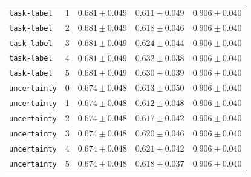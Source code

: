 \documentclass{article}
\begin{document}
\begin{center}
\begin{tabular}{llccc}
\texttt{task-label} & 1 & $0.681 \pm 0.049$ & $0.611 \pm 0.049$ & $0.906 \pm 0.040$ \\
\texttt{task-label} & 2 & $0.681 \pm 0.049$ & $0.618 \pm 0.046$ & $0.906 \pm 0.040$ \\
\texttt{task-label} & 3 & $0.681 \pm 0.049$ & $0.624 \pm 0.044$ & $0.906 \pm 0.040$ \\
\texttt{task-label} & 4 & $0.681 \pm 0.049$ & $0.632 \pm 0.038$ & $0.906 \pm 0.040$ \\
\texttt{task-label} & 5 & $0.681 \pm 0.049$ & $0.630 \pm 0.039$ & $0.906 \pm 0.040$ \\
\texttt{uncertainty} & 0 & $0.674 \pm 0.048$ & $0.613 \pm 0.050$ & $0.906 \pm 0.040$ \\
\texttt{uncertainty} & 1 & $0.674 \pm 0.048$ & $0.612 \pm 0.048$ & $0.906 \pm 0.040$ \\
\texttt{uncertainty} & 2 & $0.674 \pm 0.048$ & $0.617 \pm 0.042$ & $0.906 \pm 0.040$ \\
\texttt{uncertainty} & 3 & $0.674 \pm 0.048$ & $0.620 \pm 0.046$ & $0.906 \pm 0.040$ \\
\texttt{uncertainty} & 4 & $0.674 \pm 0.048$ & $0.621 \pm 0.042$ & $0.906 \pm 0.040$ \\
\texttt{uncertainty} & 5 & $0.674 \pm 0.048$ & $0.618 \pm 0.037$ & $0.906 \pm 0.040$ \\
\bottomrule
\end{tabular}
\end{center}
\normalsize



\end{document}
